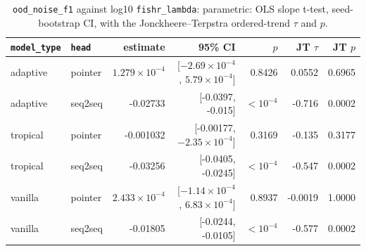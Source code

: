\documentclass[10pt]{article}
\begin{document}
{\small
\begin{longtable}{llrrrrr}
\caption{\texttt{ood\_noise\_f1} against log10 \texttt{fishr\_lambda}: parametric: OLS slope t-test, seed-bootstrap CI, with the Jonckheere--Terpstra ordered-trend $\tau$ and $p$.}\label{tab:trend-ood_noise_f1}\\
\toprule
\texttt{model\_type} & \texttt{head} & estimate & 95\% CI & $p$ & JT $\tau$ & JT $p$\\
\midrule
\endhead
adaptive & pointer & $1.279\times10^{-4}$ & [$-2.69\times10^{-4}$, $5.79\times10^{-4}$] & 0.8426 & 0.0552 & 0.6965\\
adaptive & seq2seq & -0.02733 & [-0.0397, -0.015] & $<10^{-4}$ & -0.716 & 0.0002\\
tropical & pointer & -0.001032 & [-0.00177, $-2.35\times10^{-4}$] & 0.3169 & -0.135 & 0.3177\\
tropical & seq2seq & -0.03256 & [-0.0405, -0.0245] & $<10^{-4}$ & -0.547 & 0.0002\\
vanilla & pointer & $2.433\times10^{-4}$ & [$-1.14\times10^{-4}$, $6.83\times10^{-4}$] & 0.8937 & -0.0019 & 1.0000\\
vanilla & seq2seq & -0.01805 & [-0.0244, -0.0105] & $<10^{-4}$ & -0.577 & 0.0002\\
\bottomrule
\end{longtable}
}
\end{document}
